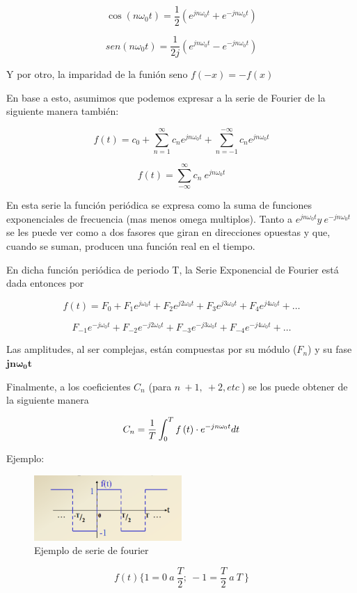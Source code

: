 \documentclass[../main.tex]{subfiles}
\begin{document}
	\[
		\cos\left( n\omega_{0}t \right) = \dfrac{1}{2}(e_{}^{jn\omega_{0}t} +
	e_{}^{- jn\omega_{0}t})
\]

	\[
		sen\left( n\omega_{0}t \right) = \dfrac{1}{2j}(e_{}^{jn\omega_{0}t} -
	e_{}^{- jn\omega_{0}t})
\]

	Y por otro, la imparidad de la funión seno
	\(f\left( - x \right) = - f\left( x \right)\)

	En base a esto, asumimos que podemos expresar a la serie de Fourier de
	la siguiente manera también:

	\[
		f\left( t \right) = c_{0} + \sum_{n = 1}^{\infty}c_{n}e^{jn\omega_{0}t} +
		\sum_{n = - 1}^{- \infty}c_{n}e^{jn\omega_{0}t}
	\]

	\[
		f\left( t \right) = \sum_{- \infty}^{\infty}{c_{n}\ e^{jn\omega_{0}t}}
	\]

	En esta serie la función periódica se expresa como la suma de
	funciones exponenciales de frecuencia (mas menos omega multiplos). Tanto
	a \(e_{}^{jn\omega_{0}t}y\ e_{}^{- jn\omega_{0}t}\) se les puede
	ver como a dos fasores que giran en direcciones opuestas y que, cuando
	se suman, producen una función real en el tiempo.

	En dicha función periódica de periodo T, la Serie Exponencial de Fourier
	está dada entonces por

	\[
		f\left( t \right) = F_{0} + F_{1}e^{j\omega_{0}t} + F_{2}e^{j{2\omega}_{0}t} + F_{3}e^{j{3\omega}_{0}t} + F_{4}e^{j4\omega_{0}t} + \ldots
	\]

	\[
		F_{- 1}e^{- j\omega_{0}t} + F_{- 2}e^{- j2\omega_{0}t} + F_{- 3}e^{- j{3\omega}_{0}t} + F_{- 4}e^{- j{4\omega}_{0}t} + \ldots
	\]

	Las amplitudes, al ser complejas, están compuestas por su módulo
	(\(F_{n}\)) y su fase
	\(\mathbf{jn}\mathbf{\omega}_{\mathbf{0}}\mathbf{t}\ \)

	Finalmente, a los coeficientes \(C_{n}\) (para
	\(n\  + 1,\  + 2,etc\ \)) se los puede obtener de la siguiente
	manera

	\[
		C_{n} = \dfrac{1}{T}\int_{0}^{T}{f\left( t \right) \cdot e^{- jn\omega_{0}t}}dt
	\]

	Ejemplo:
	\begin{figure}[H]
		\includegraphics[width=0.5\textwidth]{fourier/volpa/image2.png}
		\centering
		\caption{Ejemplo de serie de fourier}
	\end{figure}
	\[
		f\left( t \right)\{ 1 = 0\ a\ \dfrac{T}{2};\  - 1 = \frac{T}{2}\ a\ T\ \}
	\]
\end{document}
